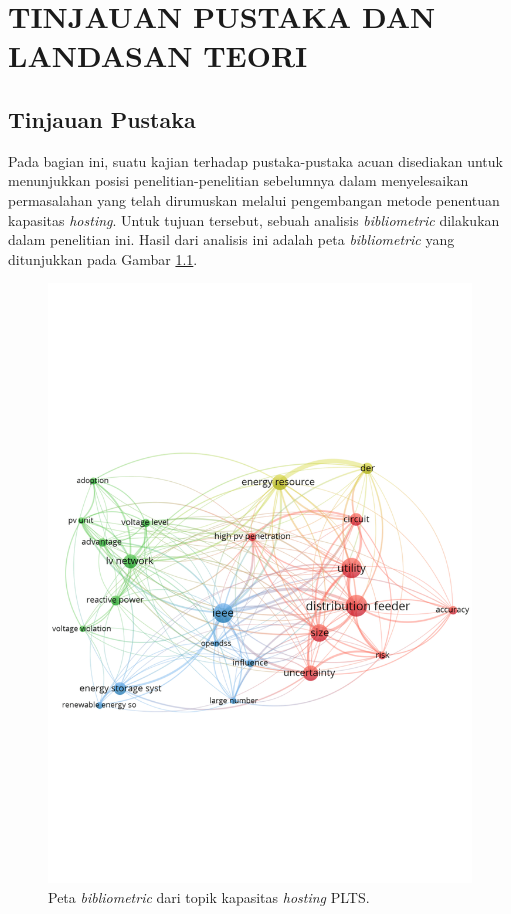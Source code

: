 \chapter{TINJAUAN PUSTAKA DAN LANDASAN TEORI}
\label{bab-tinjauan}
\section{Tinjauan Pustaka}
Pada bagian ini, suatu kajian terhadap pustaka-pustaka acuan disediakan untuk menunjukkan posisi penelitian-penelitian sebelumnya dalam menyelesaikan permasalahan yang telah dirumuskan melalui pengembangan metode penentuan kapasitas \textit{hosting}. Untuk tujuan tersebut, sebuah analisis \textit{bibliometric} dilakukan dalam penelitian ini. Hasil dari analisis ini adalah peta \textit{bibliometric} yang ditunjukkan pada Gambar \ref{biblio}.
\begin{figure}[!h]
	\centering
	\includegraphics[width=1\textwidth]{Fig/biblio}
	\caption{Peta \textit{bibliometric} dari topik kapasitas \textit{hosting} PLTS.}
	\label{biblio}
\end{figure}
